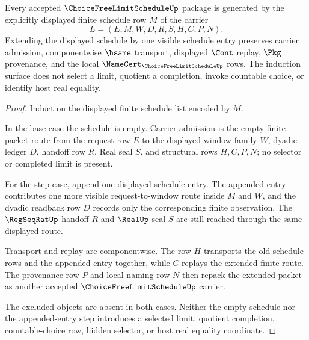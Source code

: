 \begin{theorem}
\label{thm:choice-free-limit-schedule-finite-schedule-induction}
Every accepted $\ChoiceFreeLimitScheduleUp$ package is generated by the explicitly displayed finite schedule row $M$ of the carrier
$$
L=(E,M,W,D,R,S,H,C,P,N).
$$
Extending the displayed schedule by one visible schedule entry preserves carrier admission, componentwise $\hsame$ transport, displayed $\Cont$ replay, $\Pkg$ provenance, and the local $\NameCert_{\ChoiceFreeLimitScheduleUp}$ rows. The induction surface does not select a limit, quotient a completion, invoke countable choice, or identify host real equality.
\end{theorem}
\begin{proof}
Induct on the displayed finite schedule list encoded by $M$.

In the base case the schedule is empty. Carrier admission is the empty finite packet route from the request row $E$ to the displayed window family $W$, dyadic ledger $D$, handoff row $R$, Real seal $S$, and structural rows $H,C,P,N$; no selector or completed limit is present.

For the step case, append one displayed schedule entry. The appended entry contributes one more visible request-to-window route inside $M$ and $W$, and the dyadic readback row $D$ records only the corresponding finite observation. The $\RegSeqRatUp$ handoff $R$ and $\RealUp$ seal $S$ are still reached through the same displayed route.

Transport and replay are componentwise. The row $H$ transports the old schedule rows and the appended entry together, while $C$ replays the extended finite route. The provenance row $P$ and local naming row $N$ then repack the extended packet as another accepted $\ChoiceFreeLimitScheduleUp$ carrier.

The excluded objects are absent in both cases. Neither the empty schedule nor the appended-entry step introduces a selected limit, quotient completion, countable-choice row, hidden selector, or host real equality coordinate.
\end{proof}

